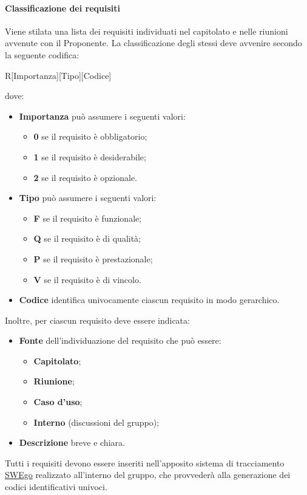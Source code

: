 \documentclass[../NormeDiProgetto.tex]{subfiles}
\begin{document}
			\paragraph{Classificazione dei requisiti\\}
				Viene stilata una lista dei requisiti individuati nel capitolato e nelle
				riunioni avvenute con il Proponente. La classificazione
				degli stessi deve avvenire secondo la seguente codifica:
				\begin{center}
					R[Importanza][Tipo][Codice]
				\end{center}
				dove:
				\begin{itemize}
					\item \textbf{Importanza} può assumere i seguenti valori:
					\begin{itemize}
						\item \textbf{0} se il requisito è obbligatorio;
						\item \textbf{1} se il requisito è desiderabile;
						\item \textbf{2} se il requisito è opzionale.
					\end{itemize}
					\item \textbf{Tipo} può assumere i seguenti valori:
					\begin{itemize}
						\item \textbf{F} se il requisito è funzionale;
						\item \textbf{Q} se il requisito è di qualità;
						\item \textbf{P} se il requisito è prestazionale;
						\item \textbf{V} se il requisito è di vincolo.
					\end{itemize}
					\item \textbf{Codice} identifica univocamente
					ciascun requisito in modo gerarchico.
				\end{itemize}
				Inoltre, per ciascun requisito deve essere indicata:
				\begin{itemize}
					\item \textbf{Fonte} dell'individuazione del requisito che può essere:
					\begin{itemize}
						\item \textbf{Capitolato};
						\item \textbf{Riunione};
						\item \textbf{Caso d'uso};
						\item \textbf{Interno} (discussioni del gruppo);
					\end{itemize}
					\item \textbf{Descrizione} breve e chiara.
				\end{itemize}
				Tutti i requisiti devono essere inseriti nell'apposito sistema di tracciamento \hyperlink{SWEgo}{SWEgo} 
				realizzato all'interno del gruppo, che provvederà alla generazione
				dei codici identificativi univoci.
				
\end{document}
